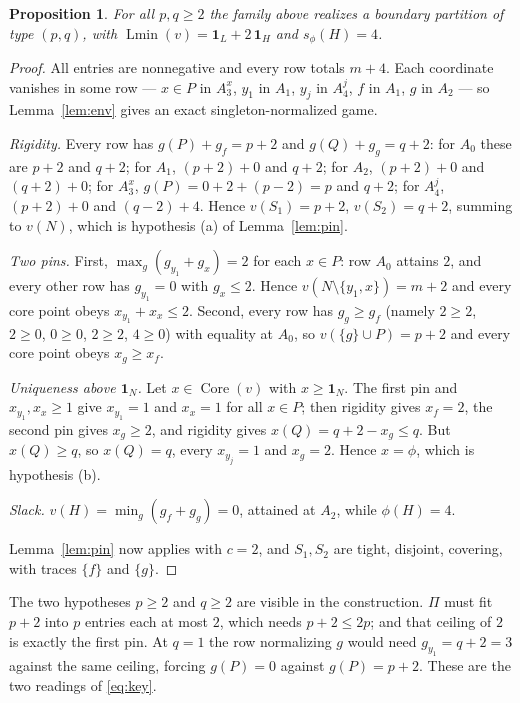 \documentclass[11pt]{article}
\newtheorem{proposition}[theorem]{Proposition}
\newcommand{\core}{\operatorname{Core}}
\newcommand{\Lmin}{\operatorname{Lmin}}
\newcommand{\one}{\mathbf 1}
\begin{document}
\begin{proposition}\label{prop:famA}
For all $p,q\ge2$ the family above realizes a boundary partition of type
$(p,q)$, with $\Lmin(v)=\one_L+2\,\one_H$ and $s_\phi(H)=4$.
\end{proposition}

\begin{proof}
All entries are nonnegative and every row totals $m+4$.  Each coordinate
vanishes in some row --- $x\in P$ in $A_3^x$, $y_1$ in $A_1$, $y_j$ in $A_4^j$,
$f$ in $A_1$, $g$ in $A_2$ --- so Lemma~\ref{lem:env} gives an exact
singleton-normalized game.

\emph{Rigidity.}  Every row has $g(P)+g_f=p+2$ and $g(Q)+g_g=q+2$: for $A_0$
these are $p+2$ and $q+2$; for $A_1$, $(p+2)+0$ and $q+2$; for $A_2$,
$(p+2)+0$ and $(q+2)+0$; for $A_3^x$, $g(P)=0+2+(p-2)=p$ and $q+2$; for
$A_4^j$, $(p+2)+0$ and $(q-2)+4$.  Hence $v(S_1)=p+2$, $v(S_2)=q+2$, summing to
$v(N)$, which is hypothesis (a) of Lemma~\ref{lem:pin}.

\emph{Two pins.}  First, $\max_g(g_{y_1}+g_x)=2$ for each $x\in P$: row $A_0$
attains $2$, and every other row has $g_{y_1}=0$ with $g_x\le2$.  Hence
$v(N\setminus\{y_1,x\})=m+2$ and every core point obeys $x_{y_1}+x_x\le2$.
Second, every row has $g_g\ge g_f$ (namely $2\ge2$, $2\ge0$, $0\ge0$, $2\ge2$,
$4\ge0$) with equality at $A_0$, so $v(\{g\}\cup P)=p+2$ and every core point
obeys $x_g\ge x_f$.

\emph{Uniqueness above $\one_N$.}  Let $x\in\core(v)$ with $x\ge\one_N$.  The
first pin and $x_{y_1},x_x\ge1$ give $x_{y_1}=1$ and $x_x=1$ for all $x\in P$;
then rigidity gives $x_f=2$, the second pin gives $x_g\ge2$, and rigidity gives
$x(Q)=q+2-x_g\le q$.  But $x(Q)\ge q$, so $x(Q)=q$, every $x_{y_j}=1$ and
$x_g=2$.  Hence $x=\phi$, which is hypothesis (b).

\emph{Slack.}  $v(H)=\min_g(g_f+g_g)=0$, attained at $A_2$, while $\phi(H)=4$.

Lemma~\ref{lem:pin} now applies with $c=2$, and $S_1,S_2$ are tight, disjoint,
covering, with traces $\{f\}$ and $\{g\}$.
\end{proof}

The two hypotheses $p\ge2$ and $q\ge2$ are visible in the construction.  $\Pi$
must fit $p+2$ into $p$ entries each at most $2$, which needs $p+2\le2p$; and
that ceiling of $2$ is exactly the first pin.  At $q=1$ the row normalizing $g$
would need $g_{y_1}=q+2=3$ against the same ceiling, forcing $g(P)=0$ against
$g(P)=p+2$.  These are the two readings of \eqref{eq:key}.
\end{document}
